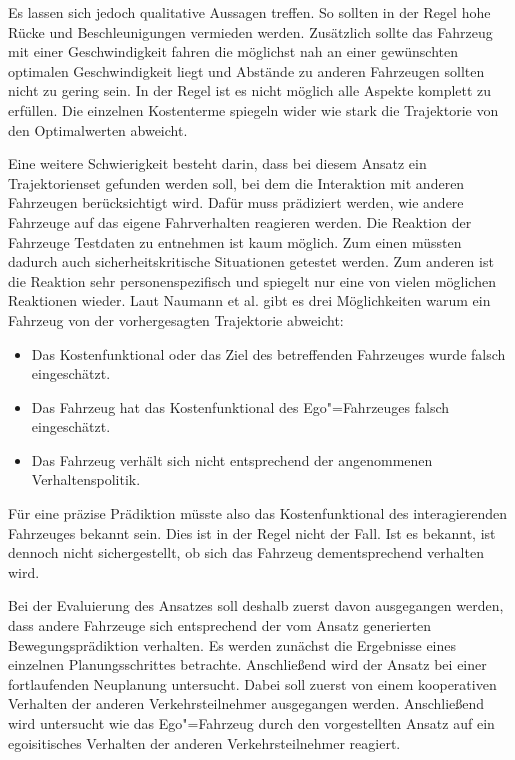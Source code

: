 Es lassen sich jedoch qualitative Aussagen treffen.
So sollten in der Regel hohe R\"ucke und Beschleunigungen vermieden werden.
Zus\"atzlich sollte das Fahrzeug mit einer Geschwindigkeit fahren die m\"oglichst nah an einer gew\"unschten optimalen Geschwindigkeit liegt und Abst\"ande zu anderen Fahrzeugen sollten nicht zu gering sein.
In der Regel ist es nicht m\"oglich alle Aspekte komplett zu erf\"ullen.
Die einzelnen Kostenterme spiegeln wider wie stark die Trajektorie von den Optimalwerten abweicht.

Eine weitere Schwierigkeit besteht darin, dass bei diesem Ansatz ein Trajektorienset gefunden werden soll, bei dem die Interaktion mit anderen Fahrzeugen ber\"ucksichtigt wird.
Daf\"ur muss pr\"adiziert werden, wie andere Fahrzeuge auf das eigene Fahrverhalten reagieren werden.
Die Reaktion der Fahrzeuge Testdaten zu entnehmen ist kaum m\"oglich.
Zum einen m\"ussten dadurch auch sicherheitskritische Situationen getestet werden.
Zum anderen ist die Reaktion sehr personenspezifisch und spiegelt nur eine von vielen m\"oglichen Reaktionen wieder.
Laut Naumann et al. \cite{Naumann2018} gibt es drei M\"oglichkeiten warum ein Fahrzeug von der vorhergesagten Trajektorie abweicht:
\begin{itemize}
\item Das Kostenfunktional oder das Ziel des betreffenden Fahrzeuges wurde falsch eingesch\"atzt.
\item Das Fahrzeug hat das Kostenfunktional des Ego"=Fahrzeuges falsch eingesch\"atzt.
\item Das Fahrzeug verh\"alt sich nicht entsprechend der angenommenen Verhaltenspolitik.
\end{itemize}
F\"ur eine pr\"azise Pr\"adiktion m\"usste also das Kostenfunktional des interagierenden Fahrzeuges bekannt sein.
Dies ist in der Regel nicht der Fall.
Ist es bekannt, ist dennoch nicht sichergestellt, ob sich das Fahrzeug dementsprechend verhalten wird.
 
Bei der Evaluierung des Ansatzes soll deshalb zuerst davon ausgegangen werden, dass andere Fahrzeuge sich entsprechend der vom Ansatz generierten Bewegungspr\"adiktion verhalten.
Es werden zun\"achst die Ergebnisse eines einzelnen Planungsschrittes betrachte.
Anschlie{\ss}end wird der Ansatz bei einer fortlaufenden Neuplanung untersucht.
Dabei soll zuerst von einem kooperativen Verhalten der anderen Verkehrsteilnehmer ausgegangen werden.
Anschlie{\ss}end wird untersucht wie das Ego"=Fahrzeug durch den vorgestellten Ansatz auf ein egoisitisches Verhalten der anderen Verkehrsteilnehmer reagiert.

